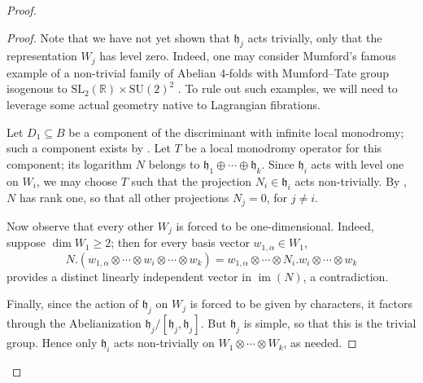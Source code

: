 \documentclass[12pt]{amsart}
\newcommand{\R}{\mathbb{R}}
\newcommand{\SL}{\mathrm{SL}}
\DeclareMathOperator{\im}{\mathrm{im}}
\theoremstyle{definition}
\numberwithin{equation}{section}
\begin{document}
\begin{proof}
\begin{proof}
Note that we have not yet shown that \(\mathfrak{h}_j\) acts trivially, only that 
the representation \(W_j\) has level zero. Indeed, one may consider Mumford's 
famous example of a non-trivial family of Abelian 4-folds with Mumford--Tate group isogenous 
to \(\SL_2(\R) \times \mathrm{SU}(2)^2\) \cite{mumford69}. To rule out such examples, 
we will need to leverage some actual geometry native to Lagrangian fibrations.

Let \(D_1 \subseteq B\) be a component of the discriminant with infinite local 
monodromy; such a component exists by . Let \(T\) be a 
local monodromy operator for this component; its logarithm \(N\) belongs to 
\(\mathfrak{h}_1 \oplus \cdots \oplus \mathfrak{h}_k\). Since \(\mathfrak{h}_i\) 
acts with level one on \(W_i\), we may choose \(T\) such that the projection 
\(N_i \in \mathfrak{h}_i\) acts non-trivially. By , 
\(N\) has rank one, so that all other projections \(N_j = 0\), for \(j \neq i\). 

Now observe that every other \(W_j\) is forced to be one-dimensional. Indeed, 
suppose \(\dim W_1 \geq 2\); then for every basis vector \(w_{1, \alpha} \in W_1\),
\begin{equation*}
    N. (w_{1, \alpha} \otimes \cdots \otimes w_i \otimes \cdots \otimes w_k) = 
    w_{1, \alpha} \otimes \cdots \otimes N_i . w_i \otimes \cdots \otimes w_k
\end{equation*}
provides a distinct linearly independent vector in \(\im(N)\), a contradiction.

Finally, since the action of \(\mathfrak{h}_j\) on \(W_j\) is forced to be given by 
characters, it factors through the Abelianization 
\(\mathfrak{h}_j/[\mathfrak{h}_j, \mathfrak{h}_j]\). But \(\mathfrak{h}_j\) is 
simple, so that this is the trivial group. Hence only \(\mathfrak{h}_i\) acts 
non-trivially on \(W_1 \otimes \cdots \otimes W_k\), as needed.
\end{proof}



\end{proof}
\end{document}
